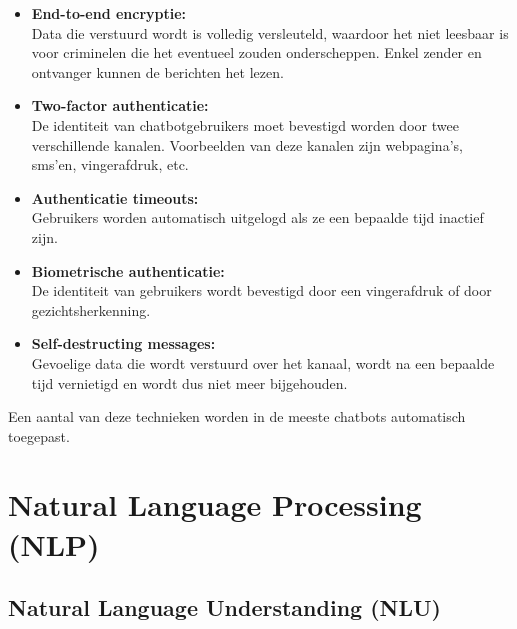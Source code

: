 \begin{itemize}
    \item \textbf{End-to-end encryptie:} \\
    
    Data die verstuurd wordt is volledig versleuteld, waardoor het niet leesbaar is voor criminelen die het eventueel zouden onderscheppen. Enkel zender en ontvanger kunnen de berichten het lezen. \\
    
    \item \textbf{Two-factor authenticatie:} \\
    
    De identiteit van chatbotgebruikers moet bevestigd worden door twee verschillende kanalen. Voorbeelden van deze kanalen zijn webpagina’s, sms’en, vingerafdruk, etc. \\
    
    \item \textbf{Authenticatie timeouts:} \\
    
    Gebruikers worden automatisch uitgelogd als ze een bepaalde tijd inactief zijn. \\
    
    \item \textbf{Biometrische authenticatie:} \\
    
    De identiteit van gebruikers wordt bevestigd door een vingerafdruk of door gezichtsherkenning. \\
    
    \item \textbf{Self-destructing messages:} \\
    
    Gevoelige data die wordt verstuurd over het kanaal, wordt na een bepaalde tijd vernietigd en wordt dus niet meer bijgehouden. \\
\end{itemize}

Een aantal van deze technieken worden in de meeste chatbots automatisch toegepast.


\section{Natural Language Processing (NLP)}
\label{sec:nlp}

\subsection{Natural Language Understanding (NLU)}
\label{subsec:nlp-nlu}

